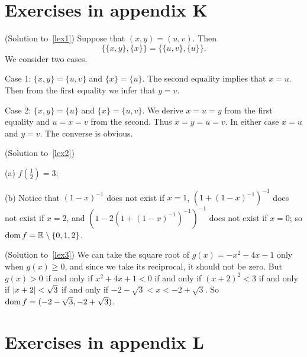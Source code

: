 \section{Exercises in appendix K}

\begin{prf}\label{sol_lex1}(Solution to~\ref{lex1})
Suppose that $(x,y) = (u,v)$. Then
 \[\bigl\{\{x,y\},\{x\}\bigr\} = \bigl\{\{u,v\},\{u\}\bigr\}.\]
We consider two cases.

Case 1: \quad $\{x,y\} = \{u,v\}$ and $\{x\} = \{u\}$.  The second equality implies that $x =
u$.  Then from the first equality we infer that $y = v$.

Case 2: \quad $\{x,y\} = \{u\}$ and $\{x\} = \{u,v\}$.  We derive $x = u = y$ from the first
equality and $u = x = v$ from the second.  Thus $x = y = u = v$. In either case $x = u$ and $y = v$.
The converse is obvious.
\end{prf}

\begin{prf}\label{sol_lex2}(Solution to~\ref{lex2})

(a) $f(\frac12) = 3$;

(b) Notice that $(1 - x)^{-1}$ does not exist if $x = 1$, $(1 + (1 - x)^{-1})^{-1}$
does not exist if $x = 2$, and $(1 - 2(1 + (1 - x)^{-1})^{-1})^{-1}$ does not exist if $x =
0$; so $\operatorname{dom} f = \mathbb{R} \setminus \{0,1,2\}$.  \qedhere
\end{prf}

\begin{prf}\label{sol_lex3}(Solution to~\ref{lex3})
We can take the square root of $g(x) = -x^2 - 4x - 1$ only when $g(x) \ge 0$, and since we
take its reciprocal, it should not be zero.  But $g(x) > 0$ if and only if $x^2 + 4 x + 1 < 0$
if and only if $(x + 2)^2 < 3$ if and only if $\lvert x + 2\rvert < \sqrt3$ if and only if $-2 -
\sqrt3 < x < -2 + \sqrt3$.  So $\operatorname{dom} f = (-2 - \sqrt3, -2 + \sqrt3)$.
\end{prf}






















\section{Exercises in appendix L}

